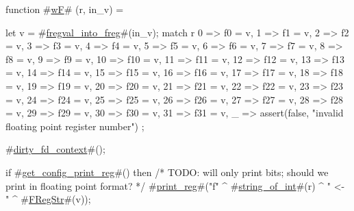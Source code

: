 function #\hyperref[sailRISCVzwF]{wF}# (r, in_v) = {
  let v = #\hyperref[sailRISCVzfregvalzyintozyfreg]{fregval\_into\_freg}#(in_v);
  match r {
    0  => f0 = v,
    1  => f1 = v,
    2  => f2 = v,
    3  => f3 = v,
    4  => f4 = v,
    5  => f5 = v,
    6  => f6 = v,
    7  => f7 = v,
    8  => f8 = v,
    9  => f9 = v,
    10 => f10 = v,
    11 => f11 = v,
    12 => f12 = v,
    13 => f13 = v,
    14 => f14 = v,
    15 => f15 = v,
    16 => f16 = v,
    17 => f17 = v,
    18 => f18 = v,
    19 => f19 = v,
    20 => f20 = v,
    21 => f21 = v,
    22 => f22 = v,
    23 => f23 = v,
    24 => f24 = v,
    25 => f25 = v,
    26 => f26 = v,
    27 => f27 = v,
    28 => f28 = v,
    29 => f29 = v,
    30 => f30 = v,
    31 => f31 = v,
    _  => assert(false, "invalid floating point register number")
  };

  #\hyperref[sailRISCVzdirtyzyfdzycontext]{dirty\_fd\_context}#();

  if   #\hyperref[sailRISCVzgetzyconfigzyprintzyreg]{get\_config\_print\_reg}#()
  then
      /* TODO: will only print bits; should we print in floating point format? */
      #\hyperref[sailRISCVzprintzyreg]{print\_reg}#("f" ^ #\hyperref[sailRISCVzstringzyofzyint]{string\_of\_int}#(r) ^ " <- " ^ #\hyperref[sailRISCVzFRegStr]{FRegStr}#(v));
}

